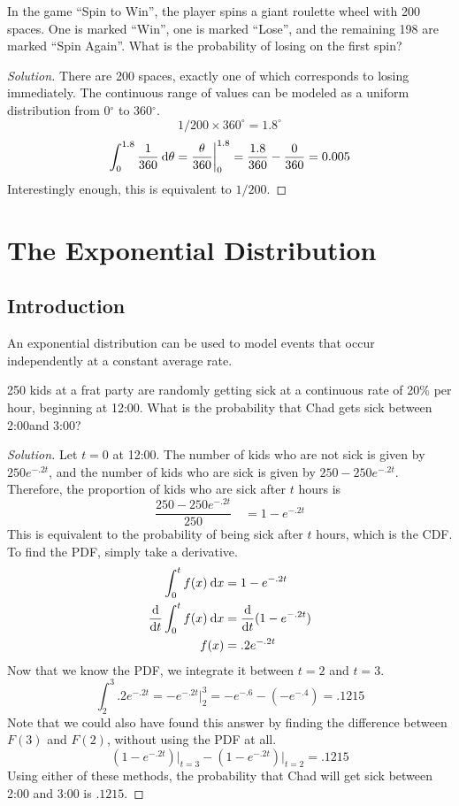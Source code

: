 \documentclass[11pt,leqno,letterpaper]{article}
\begin{document}
\begin{mdframed}
\begin{problem}
In the game ``Spin to Win'', the player spins a giant roulette wheel
with 200 spaces. One is marked ``Win'', one is marked ``Lose'',
and the remaining 198 are marked ``Spin Again''.
What is the probability of losing on the first spin?
\begin{proof}[Solution]
There are 200 spaces,
exactly one of which corresponds to losing immediately.
The continuous range of values can be modeled as
a uniform distribution from 0$^\circ$ to 360$^\circ$.
\[
1/200 \times 360^\circ = 1.8^\circ
\]
\[
\int_0^{1.8} \frac{1}{360} \:\mathrm{d}\theta
= \frac{\theta}{360} \bigg|_0^{1.8} 
= \frac{1.8}{360} - \frac{0}{360} = 0.005
\]
Interestingly enough, this is equivalent to $1/200$.
\end{proof}
\end{problem}
\end{mdframed}

\section{The Exponential Distribution}
\subsection{Introduction}
An exponential distribution can be used to model events that occur
independently at a constant average rate.

\begin{mdframed}
\begin{problem}
250 kids at a frat party are randomly getting sick at a continuous
rate of 20\% per hour, beginning at 12:00\AM .
What is the probability that Chad gets sick between 2:00\AM{ }and 3:00\AM ?
\begin{proof}[Solution]
Let $t=0$ at 12:00\AM .
The number of kids who are not sick is given by $250e^{-.2t}$,
and the number of kids who are sick is given by
$250 - 250e^{-.2t}$.
Therefore, the proportion of kids who are sick after $t$ hours is
\[
\frac{250 - 250e^{-.2t}}{250} \quad = 1 - e^{-.2t}
\]
This is equivalent to the probability of being sick after $t$ hours,
which is the CDF. To find the PDF, simply take a derivative.
\begin{align*}
\int_0^t f(x) \:\mathrm{d}x &= 1 - e^{-.2t}\\
\frac{\mathrm{d}}{\mathrm{d}t} \int_0^t f(x) \:\mathrm{d}x &= \frac{\mathrm{d}}{\mathrm{d}t} (1 - e^{-.2t})\\
f(x) &= .2e^{-.2t}
\end{align*}
Now that we know the PDF, we integrate it between $t=2$ and $t=3$.
\[
\int_2^3 .2e^{-.2t} = -e^{-.2t}\Big|_2^3 = -e^{-.6} - (-e^{-.4})
= .1215
\]
Note that we could also have found this answer by
finding the difference between $F(3)$ and $F(2)$,
without using the PDF at all.
\[
\left(1 - e^{-.2t}\right)\Big|_{t=3} -
\left(1 - e^{-.2t}\right)\Big|_{t=2} = .1215
\]
Using either of these methods, the probability that Chad will get sick
between 2:00\AM{} and 3:00\AM{} is $.1215$.
\end{proof}
\end{problem}
\end{mdframed}
\end{document}
